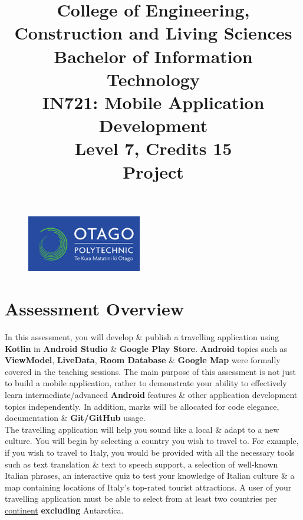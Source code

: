 \documentclass{article}
\author{}
\begin{document}
\begin{figure}
	\centering
	\includegraphics[width=50mm]{./img/logo.png}
\end{figure}

\title{College of Engineering, Construction and Living Sciences\\Bachelor of Information Technology\\IN721: Mobile Application Development\\Level 7, Credits 15\\\textbf{Project}}
\date{}
\maketitle

\section*{Assessment Overview}
In this assessment, you will develop \& publish a travelling application using \textbf{Kotlin} in \textbf{Android Studio} \& \textbf{Google Play Store}. \textbf{Android} topics such as \textbf{ViewModel}, \textbf{LiveData}, \textbf{Room Database} \& \textbf{Google Map} were formally covered in the teaching sessions. The main purpose of this assessment is not just to build a mobile application, rather to demonstrate your ability to effectively learn intermediate/advanced \textbf{Android} features \& other application development topics independently. In addition, marks will be allocated for code elegance, documentation \& \textbf{Git/GitHub} usage. \\

The travelling application will help you sound like a local \& adapt to a new culture. You will begin by selecting a country you wish to travel to. For example, if you wish to travel to Italy, you would be provided with all the necessary tools such as text translation \& text to speech support, a selection of well-known Italian phrases, an interactive quiz to test your knowledge of Italian culture \& a map containing locations of Italy's top-rated tourist attractions. A user of your travelling application must be able to select from at least two countries per \href{https://www.worldometers.info/geography/7-continents/}{continent} \textbf{excluding} Antarctica. 
\end{document}
